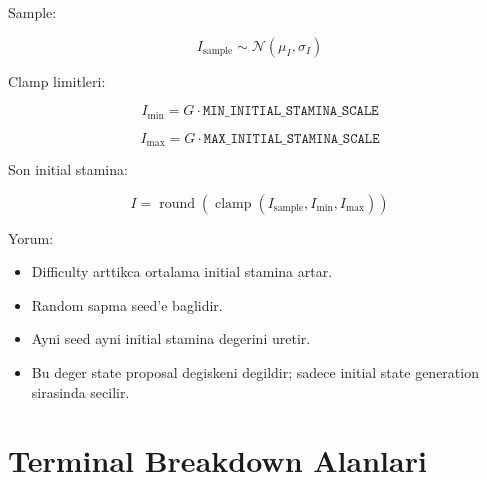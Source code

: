\documentclass[11pt]{article}
\begin{document}
Sample:

\[
I_{\text{sample}}
\sim
\mathcal{N}(\mu_I, \sigma_I)
\]

Clamp limitleri:

\[
I_{\min}
=
G
\cdot
\texttt{MIN\_INITIAL\_STAMINA\_SCALE}
\]

\[
I_{\max}
=
G
\cdot
\texttt{MAX\_INITIAL\_STAMINA\_SCALE}
\]

Son initial stamina:

\[
I
=
\operatorname{round}
\left(
\operatorname{clamp}
\left(
I_{\text{sample}},
I_{\min},
I_{\max}
\right)
\right)
\]

Yorum:

\begin{itemize}
  \item Difficulty arttikca ortalama initial stamina artar.
  \item Random sapma seed'e baglidir.
  \item Ayni seed ayni initial stamina degerini uretir.
  \item Bu deger state proposal degiskeni degildir; sadece initial state generation sirasinda secilir.
\end{itemize}

\section{Terminal Breakdown Alanlari}
\end{document}
